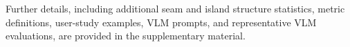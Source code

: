 Further details, including  additional seam and island structure statistics, metric definitions, user-study examples, VLM prompts, and representative VLM evaluations, are provided in the supplementary material.

